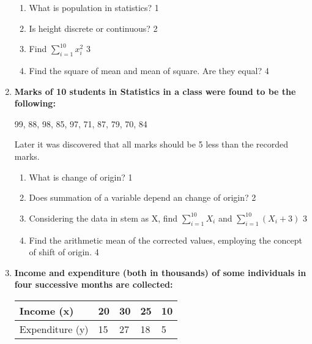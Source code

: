 \documentclass[a4paper,oneside]{book}
\begin{document}
\begin{enumerate}
  \begin{enumerate}
    \item
	What is population in statistics? \hfill 1
    \item
	Is height discrete or continuous? \hfill 2
    \item  
	Find $\displaystyle \sum_{i=1}^{10} x_i^2$ \hfill 3
    \item
	Find the square of mean and mean of square. Are they equal? \hfill 4
  \end{enumerate}
  
   \item
	  \textbf{Marks of 10 students in Statistics in a class were found to be the following:} 
	 
	 \begin{center} 
	  99, 88, 98, 85, 97, 71, 87, 79, 70, 84
	  
	  \end{center}
	  
	  Later it was discovered that all marks should be 5 less than the recorded marks. 
  
  \begin{enumerate}
    \item
	What is change of origin? \hfill 1
    \item
	Does summation of a variable depend an change of origin?  \hfill 2
    \item  
	Considering the data in stem as X, find $\displaystyle \sum_{i=1}^{10} X_i$ and $\displaystyle \sum_{i=1}^{10} (X_i+3)$ \hfill 3
    \item
	Find the arithmetic mean of the corrected values, employing the concept of shift of origin. \hfill 4
  \end{enumerate}

  \item
  \textbf{Income and expenditure (both in thousands) of some individuals in four successive months are collected:}
 
\begin{table}[h]
 \begin{center}
\begin{tabular}{l|l|l|l|l}

Income (x)  & 20 & 30 & 25 & 10 \\ \hline
Expenditure (y) & 15  & 27  & 18 & 5 \\ 
\end{tabular}
\end{center}
\end{table}



\end{enumerate}
\end{document}
